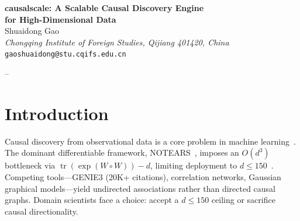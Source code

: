 \documentclass[11pt,twoside]{article}
\begin{document}
\begin{center}
{\LARGE\bfseries causalscale: A Scalable Causal Discovery Engine\\[2mm]
for High-Dimensional Data}\\[4mm]

{\large Shuaidong Gao}\\[2mm]
{\it Chongqing Institute of Foreign Studies, Qijiang 401420, China}\\[1mm]
{\tt gaoshuaidong@stu.cqifs.edu.cn}
\end{center}

\vspace{-2mm}

--\\[2mm]

\begin{abstract}
We present \texttt{causalscale}, a Python package that scales causal discovery from $d=30$ to $d=100{,}000{,}000$ on a single consumer GPU.
Unlike prior libraries that collapse under the $O(d^3)$ matrix exponential, \texttt{causalscale} provides a unified \texttt{pip install} interface
backed by three engines: LowRankGNN ($W=UV^\top$) for genome-scale data, ClusterAware Gating for heterogeneous populations, and MultiScale decomposition
for hierarchical structure. The package includes pre-trained causal backbones (DepMap 19{,}215 genes, TCGA pan-cancer), and achieves $F_1>0.98$ across
six synthetic benchmarks where competitors (NOTEARS, DAGMA, GOLEM) produce $F_1<0.05$ at $d\ge100$. As a demonstration, \texttt{causalscale}
recovered tissue-specific directionality of the ARID1A--MTOR causal axis across 33 TCGA cancers in $\sim$5 minutes on a consumer GPU, identifying
direction-specific edges in 21 of 33 cancer types. \texttt{causalscale} is available at \url{https://github.com/sgao-academics/causalscale} under MIT License.
\end{abstract}

\section{Introduction}

Causal discovery from observational data is a core problem in machine learning~\citep{zheng2018dag,glymour2019review}.
The dominant differentiable framework, NOTEARS~\citep{zheng2018dag}, imposes an $O(d^3)$ bottleneck via
$\operatorname{tr}(\exp(W\circ W))-d$, limiting deployment to $d\le150$~\citep{gao2025diagnostic}.
Competing tools---GENIE3 (20K+ citations), correlation networks, Gaussian graphical models---yield
undirected associations rather than directed causal graphs. Domain scientists face a choice:
accept a $d\le150$ ceiling or sacrifice causal directionality.
\end{document}
